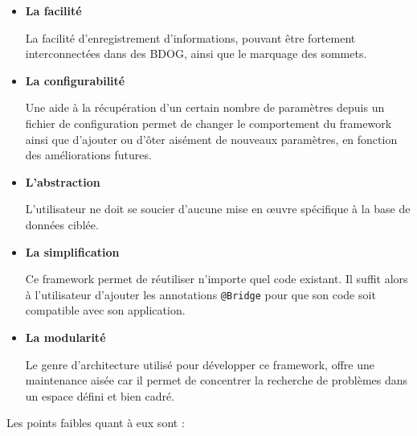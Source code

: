 \documentclass[a4paper,fleqn,12pt,oneside]{report}
\begin{document}
\begin{itemize}
\item \textbf{La facilité}

\quad La facilité d'enregistrement d'informations, pouvant être fortement interconnectées dans des BDOG, ainsi que le marquage des sommets.

\item \textbf{La configurabilité}

\quad Une aide à la récupération d'un certain nombre de paramètres depuis un fichier de configuration permet de changer le comportement du framework ainsi que d’ajouter ou d’ôter aisément de nouveaux paramètres, en fonction des améliorations futures.

\item \textbf{L'abstraction}

\quad L'utilisateur ne doit se soucier d'aucune mise en œuvre spécifique à la base de données ciblée. 

\item \textbf{La simplification}

\quad Ce framework permet de réutiliser n'importe quel code existant. Il suffit alors à l'utilisateur d'ajouter les annotations \texttt{@Bridge} pour que son code soit compatible avec son application.

\item \textbf{La modularité}

\quad Le genre d'architecture utilisé pour développer ce framework, offre une maintenance aisée car il permet de concentrer la recherche de problèmes dans un espace défini et bien cadré.

\end{itemize}
\newpage
Les points faibles quant à eux sont :
\end{document}
